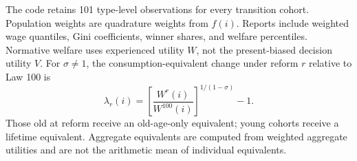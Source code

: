 \documentclass[12pt]{article}
\newcommand{\1}{\mathbf{1}}
\begin{document}
The code retains 101 type-level observations for every transition cohort. Population weights
are quadrature weights from $f(i)$. Reports include weighted wage quantiles, Gini coefficients,
winner shares, and welfare percentiles. Normative welfare uses experienced utility $W$, not
the present-biased decision utility $V$. For $\sigma\neq1$, the consumption-equivalent change
under reform $r$ relative to Law 100 is
\begin{equation}
\lambda_r(i)=
\left[\frac{W^r(i)}{W^{100}(i)}\right]^{1/(1-\sigma)}-1.
\end{equation}
Those old at reform receive an old-age-only equivalent; young cohorts receive a lifetime
equivalent. Aggregate equivalents are computed from weighted aggregate utilities and are not
the arithmetic mean of individual equivalents.


\end{document}
